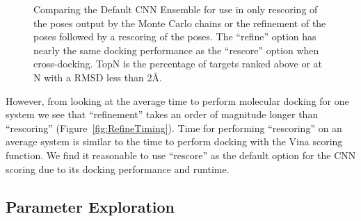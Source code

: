 \documentclass[linenumbers,doublespacing]{bmcart}
\begin{document}
\begin{figure}[tbh]
	\caption{Comparing the Default CNN Ensemble for use in only rescoring of the poses output by the Monte Carlo chains or the refinement of the poses followed by a rescoring of the poses. The ``refine'' option has nearly the same docking performance as the ``rescore'' option when cross-docking. TopN is the percentage of targets ranked above or at N with a RMSD less than 2{\AA}.}
	\label{fig:CompareRescoreRefine}
\end{figure}    

However, from looking at the average time to perform molecular docking for one system we see that ``refinement'' takes an order of magnitude longer than ``rescoring'' (Figure~\ref{fig:RefineTiming}). Time for performing ``rescoring'' on an average system is similar to the time to perform docking with the Vina scoring function. We find it reasonable to use ``rescore'' as the default option for the CNN scoring due to its docking performance and runtime.

\subsection{Parameter Exploration}
\end{document}
